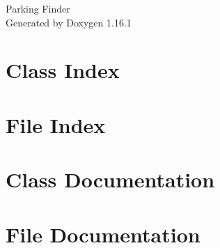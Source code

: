 \documentclass[twoside]{book}
\newcommand{\+}{\discretionary{\mbox{\scriptsize$\hookleftarrow$}}{}{}}
\newcommand{\clearemptydoublepage}{%
    \newpage{\pagestyle{empty}\cleardoublepage}%
  }
\begin{document}
  \raggedbottom
    \hypersetup{pageanchor=false,
                bookmarksnumbered=true,
                pdfencoding=unicode
               }
  \begin{titlepage}
  \vspace*{7cm}
  \begin{center}%
  {\Large Parking Finder}\\
  \vspace*{1cm}
  {\large Generated by Doxygen 1.16.1}\\
  \end{center}
  \end{titlepage}
  \clearemptydoublepage
  \tableofcontents
  \clearemptydoublepage
  \hypersetup{pageanchor=true}
\chapter{Class Index}

\chapter{File Index}

\chapter{Class Documentation}





\chapter{File Documentation}
























  \backmatter
  \newpage
  \clearemptydoublepage
  \printindex
\end{document}
